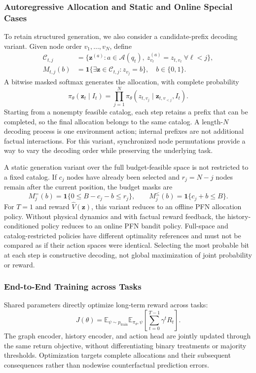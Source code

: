 \documentclass[a4paper,11pt]{article}
\newcommand{\E}{\mathbb E}
\newcommand{\ind}{\mathbf 1}
\numberwithin{equation}{section}
\begin{document}
\subsubsection{Autoregressive Allocation and Static and Online Special Cases}
To retain structured generation, we also consider a candidate-prefix decoding variant. Given node order $v_1,\ldots,v_N$, define
\begin{align}
\mathcal C_{t,j}&=\{\mathbf z^{(a)}:a\in\mathcal A(q_t),\ 
z_{v_\ell}^{(a)}=z_{t,v_\ell}\ \forall\ell<j\},\\
M_{t,j}(b)&=\ind\{\exists\mathbf z\in\mathcal C_{t,j}:z_{v_j}=b\},\quad b\in\{0,1\}.
\end{align}
A bitwise masked softmax generates the allocation, with complete probability
\begin{equation}
\pi_\theta(\mathbf z_t\mid I_t)=\prod_{j=1}^N
\pi_\theta(z_{t,v_j}\mid\mathbf z_{t,v_{<j}},I_t).
\label{eq:autoregressive}
\end{equation}
Starting from a nonempty feasible catalog, each step retains a prefix that can be completed, so the final allocation belongs to the same catalog. A length-$N$ decoding process is one environment action; internal prefixes are not additional factual interactions. For this variant, synchronized node permutations provide a way to vary the decoding order while preserving the underlying task.

A static generation variant over the full budget-feasible space is not restricted to a fixed catalog. If $c_j$ nodes have already been selected and $r_j=N-j$ nodes remain after the current position, the budget masks are
\begin{equation}
M_j^{=}(b)=\ind\{0\leq B-c_j-b\leq r_j\},\qquad
M_j^{\leq}(b)=\ind\{c_j+b\leq B\}.
\label{eq:budget-mask}
\end{equation}
For $T=1$ and reward $\widehat V(\mathbf z)$, this variant reduces to an offline PFN allocation policy. Without physical dynamics and with factual reward feedback, the history-conditioned policy reduces to an online PFN bandit policy. Full-space and catalog-restricted policies have different optimality references and must not be compared as if their action spaces were identical. Selecting the most probable bit at each step is constructive decoding, not global maximization of joint probability or reward.

\subsubsection{End-to-End Training across Tasks}
Shared parameters directly optimize long-term reward across tasks:
\begin{equation}
J(\theta)=\E_{\psi\sim p_{\mathrm{train}}}\E_{\pi_\theta,\psi}
\left[\sum_{t=0}^{T-1}\gamma^tR_t\right].
\label{eq:meta-objective}
\end{equation}
The graph encoder, history encoder, and action head are jointly updated through the same return objective, without differentiating binary treatments or majority thresholds. Optimization targets complete allocations and their subsequent consequences rather than nodewise counterfactual prediction errors.
\end{document}
